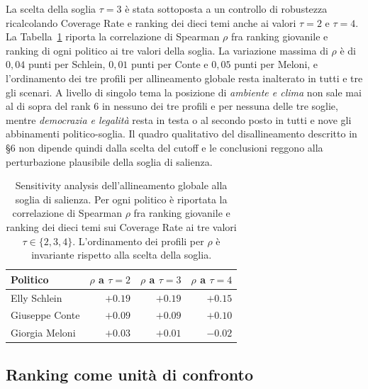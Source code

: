 \documentclass[11pt, a4paper]{article}
\begin{document}
La scelta della soglia $\tau=3$ \`e stata sottoposta a un controllo
di robustezza ricalcolando Coverage Rate e ranking dei dieci temi
anche ai valori $\tau=2$ e $\tau=4$. La Tabella~\ref{tab:tausens}
riporta la correlazione di Spearman $\rho$ fra ranking giovanile e
ranking di ogni politico ai tre valori della soglia. La variazione
massima di $\rho$ \`e di $0{,}04$ punti per Schlein, $0{,}01$ punti
per Conte e $0{,}05$ punti per Meloni, e l'ordinamento dei tre
profili per allineamento globale resta inalterato in tutti e tre gli
scenari. A livello di singolo
tema la posizione di \emph{ambiente e clima} non sale mai al di
sopra del rank $6$ in nessuno dei tre profili e per nessuna delle
tre soglie, mentre \emph{democrazia e legalit\`a} resta in testa o
al secondo posto in tutti e nove gli abbinamenti politico-soglia. Il
quadro qualitativo del disallineamento descritto in \S 6 non dipende
quindi dalla scelta del cutoff e
le conclusioni reggono alla perturbazione plausibile della soglia di
salienza.

\begin{table}[!htbp]
\centering
\caption{Sensitivity analysis dell'allineamento globale alla soglia
di salienza. Per ogni politico \`e riportata la correlazione di
Spearman $\rho$ fra ranking giovanile e ranking dei dieci temi sui
Coverage Rate ai tre valori $\tau\in\{2,3,4\}$. L'ordinamento dei
profili per $\rho$ \`e invariante rispetto alla scelta della soglia.}
\label{tab:tausens}
\small
\begin{tabular}{l r r r}
\toprule
\textbf{Politico} & \textbf{$\rho$ a $\tau=2$} & \textbf{$\rho$ a $\tau=3$} & \textbf{$\rho$ a $\tau=4$} \\
\midrule
Elly Schlein      & $+0.19$ & $+0.19$ & $+0.15$ \\
Giuseppe Conte    & $+0.09$ & $+0.09$ & $+0.10$ \\
Giorgia Meloni    & $+0.03$ & $+0.01$ & $-0.02$ \\
\bottomrule
\end{tabular}
\end{table}

\subsection{Ranking come unit\`a di confronto}\label{sec:rank}
\end{document}
